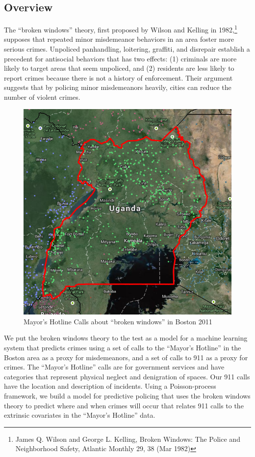 \documentclass[a0,final]{a0poster}
\begin{document}
\begin{multicols}{3}							%
\raggedcolumns							%

\section*{Overview}
The ``broken windows'' theory, first proposed by Wilson and Kelling in 1982,\footnote{James Q. Wilson and George L. Kelling, Broken Windows: The Police and Neighborhood Safety, Atlantic Monthly 29, 38 (Mar 1982)} supposes that repeated minor misdemeanor behaviors in an area foster more serious crimes. Unpoliced panhandling, loitering, graffiti, and disrepair establish a precedent for anti­social behaviors that has two effects: (1) criminals are more likely to target areas that seem unpoliced, and (2) residents are less likely to report crimes because there is not a history of enforcement. Their argument suggests that by policing minor misdemeanors heavily, cities can reduce the number of violent crimes.\\
\begin{figure}[H]
\centering
\includegraphics[scale=0.6]{figs/uganda.png}
\caption{Mayor's Hotline Calls about ``broken windows'' in Boston 2011}
\end{figure}
\noindent We put the broken windows theory to the test as a model for a machine learning system that predicts crimes using a set of calls to the ``Mayor's Hotline'' in the Boston area as a proxy for misdemeanors, and a set of calls to 911 as a proxy for crimes. The ``Mayor's Hotline'' calls are for government services and have categories that represent physical neglect and denigration of spaces. Our 911 calls have the location and description of incidents. Using a Poisson-process framework, we build a model for predictive­ policing that uses the broken windows theory to predict where and when crimes will occur that relates 911 calls to the extrinsic covariates in the ``Mayor's Hotline'' data.\\

\end{multicols}
\end{document}
